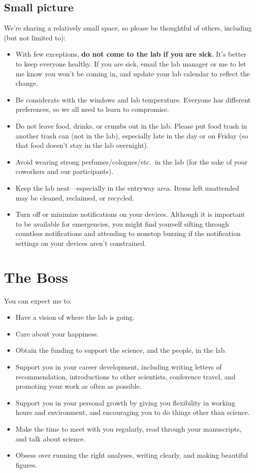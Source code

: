 \documentclass[letterpaper,12pt,oneside]{memoir}
\begin{document}
\subsection{Small picture}

We're sharing a relatively small space, so please be thoughtful of others, including (but not limited to):

\begin{itemize}
\item With few exceptions, \textbf{do not come to the lab if you are sick}. It's better to keep everyone healthy. If you are sick, email the lab manager or me to let me know you won't be coming in, and update your lab calendar to reflect the change.
\item Be considerate with the windows and lab temperature. Everyone has different preferences, so we all need to learn to compromise.
\item Do not leave food, drinks, or crumbs out in the lab. Please put food trash in another trash can (not in the lab), especially late in the day or on Friday (so that food doesn't stay in the lab overnight).
\item Avoid wearing strong perfumes/colognes/etc.\ in the lab (for the sake of your coworkers and our participants).
\item Keep the lab neat---especially in the entryway area. Items left unattended may be cleaned, reclaimed, or recycled.
\item Turn off or minimize notifications on your devices. Although it is important to be available for emergencies, you might find yourself sifting through countless notifications and attending to nonstop buzzing if the notification settings on your devices aren't constrained.
\end{itemize}


\section{The Boss}

You can expect me to:

\begin{itemize}
\item Have a vision of where the lab is going.
\item Care about your happiness.
\item Obtain the funding to support the science, and the people, in the lab.
\item Support you in your career development, including writing letters of recommendation, introductions to other scientists, conference travel, and promoting your work as often as possible.
\item Support you in your personal growth by giving you flexibility in working hours and environment, and encouraging you to do things other than science.
\item Make the time to meet with you regularly, read through your manuscripts, and talk about science.
\item Obsess over running the right analyses, writing clearly, and making beautiful figures.
\end{itemize}
\end{document}

